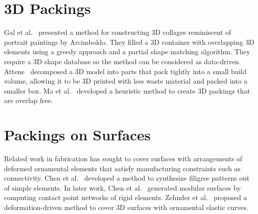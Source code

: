 \section{3D Packings}
Gal et al.~\cite{Gal2007B} presented a method for constructing 3D
collages reminiscent of portrait paintings by Arcimboldo.  They
filled a 3D container with overlapping 3D elements using a greedy
approach and a partial shape matching algorithm.
They require a 3D shape database so the method can be considered as data-driven. 
Attene~\cite{Attene2015} decomposed a 3D model into parts that pack
tightly into a small build volume, allowing it to 
be 3D printed with less waste material and packed into a smaller box.
Ma et al.~\cite{Ma2018} developed a heuristic method
to create 3D packings that are overlap free.

\section{Packings on Surfaces}
Related work in fabrication has sought to cover surfaces with
arrangements of deformed ornamental elements that satisfy manufacturing
constraints such as connectivity.  Chen et al.~\cite{Chen2016}
developed a method to synthesize filigree patterns out of simple elements. 
In later work, Chen et al.~\cite{Chen2017}
generated modular surfaces by computing 
contact point networks of rigid elements.
Zehnder et al.~\cite{Zehnder2016} proposed a deformation-driven method to cover
3D surfaces with ornamental elastic curves.



